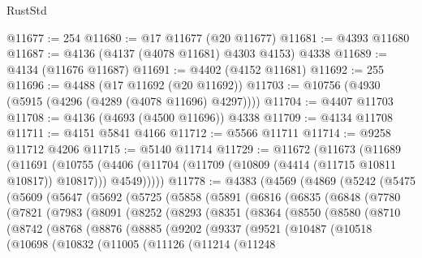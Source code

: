\begin{lexlean}{RustStd}
\begin{coremodule}
@11677 := 254
@11680 := @17 @11677 (@20 @11677)
@11681 := @4393 @11680
@11687 := @4136 (@4137 (@4078 @11681) @4303 @4153) @4338
@11689 := @4134 (@11676 @11687)
@11691 := @4402 (@4152 @11681)
@11692 := 255
@11696 := @4488 (@17 @11692 (@20 @11692))
@11703 := @10756 (@4930 (@5915 (@4296 (@4289 (@4078 @11696) @4297))))
@11704 := @4407 @11703
@11708 := @4136 (@4693 (@4500 @11696)) @4338
@11709 := @4134 @11708
@11711 := @4151 @5841 @4166
@11712 := @5566 @11711
@11714 := @9258 @11712 @4206
@11715 := @5140 @11714
@11729 := @11672
    (@11673
      (@11689
        (@11691
          (@10755 (@4406 (@11704 (@11709 (@10809 (@4414 (@11715 @10811 @10817)) @10817))) @4549)))))
@11778 := @4383
    (@4569
      (@4869
        (@5242
          (@5475
            (@5609
              (@5647
                (@5692
                  (@5725
                    (@5858
                      (@5891
                        (@6816
                          (@6835
                            (@6848
                              (@7780
                                (@7821
                                  (@7983
                                    (@8091
                                      (@8252
                                        (@8293
                                          (@8351
                                            (@8364
                                              (@8550
                                                (@8580
                                                  (@8710
                                                    (@8742
                                                      (@8768
                                                        (@8876
                                                          (@8885
                                                            (@9202
                                                              (@9337
                                                                (@9521
                                                                  (@10487
                                                                    (@10518
                                                                      (@10698
                                                                        (@10832
                                                                          (@11005
                                                                            (@11126
                                                                              (@11214
                                                                                (@11248

\end{coremodule}
\end{lexlean}
